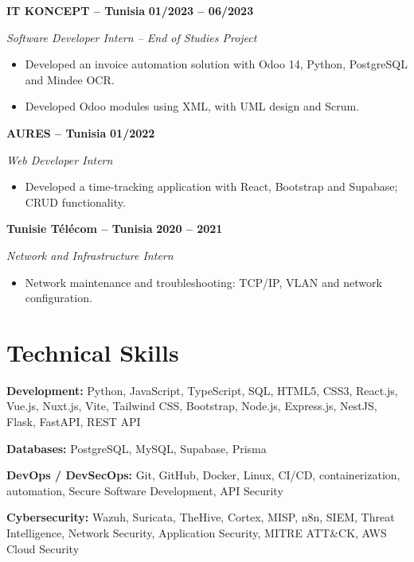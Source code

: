 \documentclass[10pt,a4paper]{article}
\begin{document}
\textbf{IT KONCEPT -- Tunisia}
\hfill \textbf{01/2023 -- 06/2023}

\textit{Software Developer Intern -- End of Studies Project}

\begin{itemize}
    \item Developed an invoice automation solution with Odoo 14, Python,
    PostgreSQL and Mindee OCR.
    \item Developed Odoo modules using XML, with UML design and Scrum.
\end{itemize}

\textbf{AURES -- Tunisia}
\hfill \textbf{01/2022}

\textit{Web Developer Intern}

\begin{itemize}
    \item Developed a time-tracking application with React, Bootstrap and
    Supabase; CRUD functionality.
\end{itemize}

\textbf{Tunisie Télécom -- Tunisia}
\hfill \textbf{2020 -- 2021}

\textit{Network and Infrastructure Intern}

\begin{itemize}
    \item Network maintenance and troubleshooting: TCP/IP, VLAN and network
    configuration.
\end{itemize}


\section*{Technical Skills}

\textbf{Development:}
Python, JavaScript, TypeScript, SQL, HTML5, CSS3, React.js, Vue.js, Nuxt.js,
Vite, Tailwind CSS, Bootstrap, Node.js, Express.js, NestJS, Flask, FastAPI,
REST API

\textbf{Databases:}
PostgreSQL, MySQL, Supabase, Prisma

\textbf{DevOps / DevSecOps:}
Git, GitHub, Docker, Linux, CI/CD, containerization, automation,
Secure Software Development, API Security

\textbf{Cybersecurity:}
Wazuh, Suricata, TheHive, Cortex, MISP, n8n, SIEM, Threat Intelligence,
Network Security, Application Security, MITRE ATT\&CK, AWS Cloud Security
\end{document}
